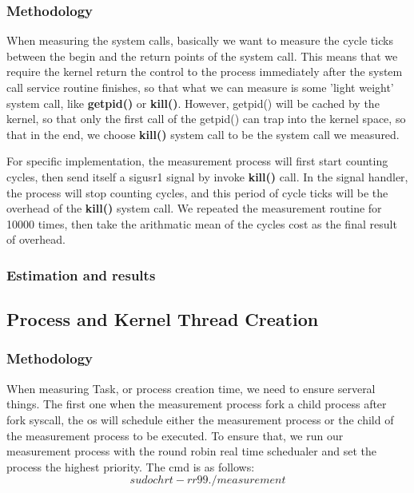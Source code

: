 \subsubsection{Methodology}

When measuring the system calls, basically we want to measure the cycle ticks between the begin and the return points of the system call. This means that we require the kernel return the control to the process immediately after the system call service routine finishes, so that what we can measure is some 'light weight' system call, like \textbf{getpid()} or \textbf{kill()}. However, getpid() will be cached by the kernel, so that only the first call of the getpid() can trap into
the kernel space, so that in the end, we choose \textbf{kill()} system call to be the system call we measured.

For specific implementation, the measurement process will first start counting cycles, then send itself a sigusr1 signal by invoke \textbf{kill()} call. In the signal handler, the process will stop counting cycles, and this period of cycle ticks
will be the overhead of the \textbf{kill()} system call. We repeated the measurement routine for 10000 times, then take the arithmatic mean of the cycles cost as the final result of overhead.


\subsubsection{Estimation and results}



\subsection{Process and Kernel Thread Creation}

\subsubsection{Methodology}
\label {creation_methodology}

When measuring Task, or process creation time, we need to ensure serveral things. The first one when the measurement process fork a child process after fork syscall, the os will schedule either the measurement process or the child of the measurement process to be executed. To ensure that, we run our measurement process with the round robin real time schedualer and set the process the highest priority. The cmd is as follows:
    $$ sudo chrt -rr 99 ./measurement $$

